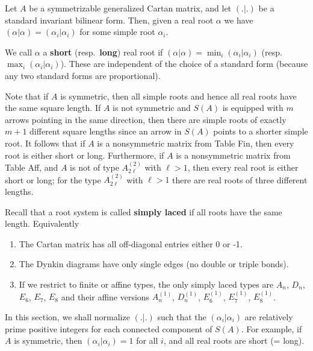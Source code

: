\documentclass[12pt]{article}
\begin{document}
Let $A$ be a symmetrizable generalized Cartan matrix, and let $(.|.)$ be a
standard invariant bilinear form. Then, given a real root $\alpha$ we
have $(\alpha|\alpha) = (\alpha_i|\alpha_i)$ for some simple root $\alpha_i$.

\begin{definition}
    We call $\alpha$ a \textbf{short} (resp.\ \textbf{long}) real root if
    $(\alpha|\alpha) = \min_i(\alpha_i|\alpha_i)$ (resp.\
    $\max_i(\alpha_i|\alpha_i)$). These are independent of the choice of a standard
    form (because any two standard forms are proportional).
\end{definition}
Note that if $A$ is symmetric, then all simple roots and hence all real
roots have the same square length. If $A$ is not symmetric and $S(A)$ is equipped
with $m$ arrows pointing in the same direction, then there are simple roots of
exactly $m+1$ different square lengths since an arrow in $S(A)$ points to a
shorter simple root. It follows that if $A$ is a nonsymmetric matrix from Table
Fin, then every root is either short or long. Furthermore, if $A$ is a nonsymmetric  matrix from Table Aff, and $A$ is not of type $A_{2\ell}^{(2)}$ with $\ell > 1$, then every real root is either short or long; for the type $A_{2\ell}^{(2)}$ with
$\ell > 1$ there are real roots of three different lengths.

\begin{remark}
    Recall that a root system is called \textbf{simply laced} if all roots have the same length. Equivalently \begin{enumerate}
        \item The Cartan matrix has all off-diagonal entries either 0 or -1.
        \item The Dynkin diagrams have only single edges (no double or triple bonds).
        \item If we restrict to finite or affine types, the only simply laced types are $A_n$, $D_n$, $E_6$, $E_7$, $E_8$ and their affine versions $A_n^{(1)}$, $D_n^{(1)}$, $E_6^{(1)}$, $E_7^{(1)}$, $E_8^{(1)}$.
    \end{enumerate}

\end{remark}

In this section, we shall normalize $(.|.)$ such that the $(\alpha_i|\alpha_i)$
are relatively prime positive integers for each connected component of $S(A)$.
For example, if $A$ is symmetric, then $(\alpha_i|\alpha_i)=1$ for all $i$, and
all real roots are short (= long).
\end{document}
